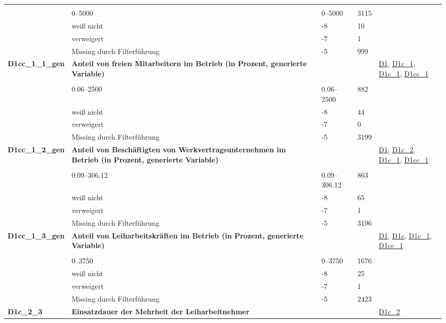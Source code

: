 \begin{longtable}{| L{2.5cm} | L{8.25cm}| C{1.5cm} | R{1.25cm} | C{2.25cm} |  }
   &  &  &  &  \\ 
   & 0--5000 & 0--5000 & 3115 &  \\ 
   & weiß nicht & -8 & 10 &  \\ 
   & verweigert & -7 & 1 &  \\ 
   & Missing durch Filterführung & -5 & 999 &  \\ 
   \midrule
\textbf{D1cc\_1\_1\_gen}\label{var:suf:D1cc:1:1:gen} & \textbf{Anteil von freien Mitarbeitern im Betrieb (in Prozent, generierte Variable)} &  &  & \hyperref[D1]{D1}, \hyperref[D1c:1]{D1c\_1}, \hyperref[D1c:1]{D1c\_1}, \hyperref[D1cc:1]{D1cc\_1} \\ 
   &  &  &  &  \\ 
   & 0.06--2500 & 0.06--2500 & 882 &  \\ 
   & weiß nicht & -8 & 44 &  \\ 
   & verweigert & -7 & 0 &  \\ 
   & Missing durch Filterführung & -5 & 3199 &  \\ 
   \midrule
\textbf{D1cc\_1\_2\_gen}\label{var:suf:D1cc:1:2:gen} & \textbf{Anteil von Beschäftigten von Werkvertragsunternehmen im Betrieb (in Prozent, generierte Variable)} &  &  & \hyperref[D1]{D1}, \hyperref[D1c:2]{D1c\_2}, \hyperref[D1c:1]{D1c\_1}, \hyperref[D1cc:1]{D1cc\_1} \\ 
   &  &  &  &  \\ 
   & 0.09--306.12 & 0.09--306.12 & 863 &  \\ 
   & weiß nicht & -8 & 65 &  \\ 
   & verweigert & -7 & 1 &  \\ 
   & Missing durch Filterführung & -5 & 3196 &  \\ 
   \midrule
\textbf{D1cc\_1\_3\_gen}\label{var:suf:D1cc:1:3:gen} & \textbf{Anteil von Leiharbeitskräften im Betrieb (in Prozent, generierte Variable)} &  &  & \hyperref[D1]{D1}, \hyperref[D1c]{D1c}, \hyperref[D1c:1]{D1c\_1}, \hyperref[D1cc:1]{D1cc\_1} \\ 
   &  &  &  &  \\ 
   & 0--3750 & 0--3750 & 1676 &  \\ 
   & weiß nicht & -8 & 25 &  \\ 
   & verweigert & -7 & 1 &  \\ 
   & Missing durch Filterführung & -5 & 2423 &  \\ 
   \midrule
\textbf{D1c\_2\_3}\label{var:suf:D1c:2:3} & \textbf{Einsatzdauer der Mehrheit der Leiharbeitnehmer} &  &  & \hyperref[D1c:2]{D1c\_2} \\ 

\end{longtable}
